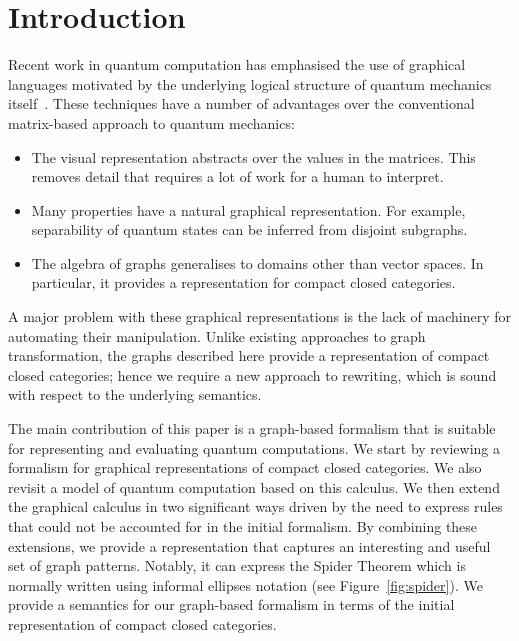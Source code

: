 \documentclass[runningheads]{llncs}
\begin{document}
\section{Introduction}
\label{sec:introduction}

Recent work in quantum computation has emphasised the use of graphical
languages motivated by the underlying logical structure of quantum
mechanics
itself~\cite{AbrCoe:CatSemQuant:2004,Selinger:dagger:2005,Coecke2005Kindergarten-Qu,Coecke2006POVMs-and-Naima,Coecke2006Quantum-Measure}.
These techniques have a number of advantages over the conventional
matrix-based approach to quantum mechanics:

\begin{itemize}
\item The visual representation abstracts over the values in the
  matrices. This removes detail that requires a lot of work for a
  human to interpret. 

\item Many properties have a natural graphical representation. For
  example, separability of quantum states can be inferred from disjoint subgraphs.

\item The algebra of graphs generalises to domains other than
  vector spaces. In particular, it provides a representation for
  compact closed categories. 

\end{itemize}

A major problem with these graphical representations is the lack of
machinery for automating their manipulation. Unlike existing approaches to
graph transformation, the graphs described here provide a 
representation of compact closed categories; hence we require a new
approach to rewriting, which is sound with respect to the underlying
semantics.

The main contribution of this paper is a graph-based formalism that is
suitable for representing and evaluating quantum computations. We
start by reviewing a formalism for graphical representations of
compact closed categories. We also revisit a model of quantum
computation based on this calculus. We then extend the graphical
calculus in two significant ways driven by the need to express rules
that could not be accounted for in the initial formalism. By combining
these extensions, we provide a representation that captures an
interesting and useful set of graph patterns. Notably, it can express
the Spider Theorem which is normally written using informal ellipses
notation (see Figure~\ref{fig:spider}). We provide a semantics for our
graph-based formalism in terms of the initial representation of
compact closed categories.
\end{document}
